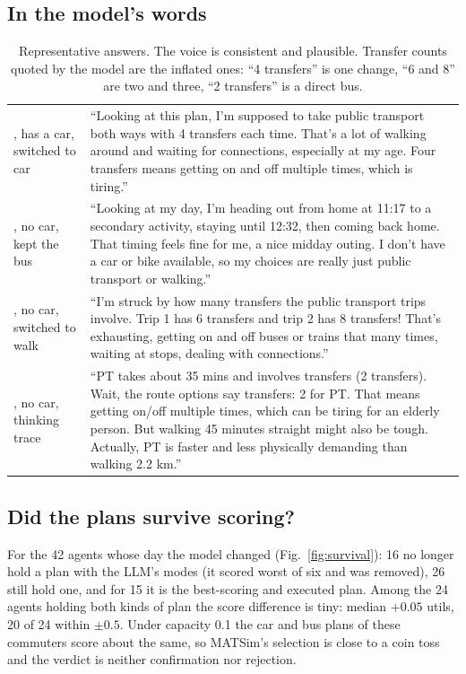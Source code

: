 \documentclass[10pt,a4paper]{article}
\begin{document}
\subsection{In the model's words}
\begin{table}[h]\small\centering
\begin{tabularx}{\textwidth}{@{}>{\raggedright\arraybackslash}p{3.1cm}X@{}}\toprule
53, has a car, switched to car & ``Looking at this plan, I'm supposed to take public transport both ways with 4 transfers each time. That's a lot of walking around and waiting for connections, especially at my age. Four transfers means getting on and off multiple times, which is tiring.'' \\
76, no car, kept the bus & ``Looking at my day, I'm heading out from home at 11:17 to a secondary activity, staying until 12:32, then coming back home. That timing feels fine for me, a nice midday outing. I don't have a car or bike available, so my choices are really just public transport or walking.'' \\
43, no car, switched to walk & ``I'm struck by how many transfers the public transport trips involve. Trip 1 has 6 transfers and trip 2 has 8 transfers! That's exhausting, getting on and off buses or trains that many times, waiting at stops, dealing with connections.'' \\
80, no car, thinking trace & ``PT takes about 35 mins and involves transfers (2 transfers). Wait, the route options say transfers: 2 for PT. That means getting on/off multiple times, which can be tiring for an elderly person. But walking 45 minutes straight might also be tough. Actually, PT is faster and less physically demanding than walking 2.2 km.'' \\
\bottomrule\end{tabularx}
\caption{Representative answers. The voice is consistent and plausible. Transfer counts quoted by the model are the inflated ones: ``4 transfers'' is one change, ``6 and 8'' are two and three, ``2 transfers'' is a direct bus.}
\end{table}

\subsection{Did the plans survive scoring?}
For the 42 agents whose day the model changed (Fig.~\ref{fig:survival}): 16 no longer hold a plan with the LLM's modes (it scored worst of six and was removed), 26 still hold one, and for 15 it is the best-scoring and executed plan. Among the 24 agents holding both kinds of plan the score difference is tiny: median $+0.05$ utils, 20 of 24 within $\pm0.5$. Under capacity 0.1 the car and bus plans of these commuters score about the same, so MATSim's selection is close to a coin toss and the verdict is neither confirmation nor rejection.
\end{document}
